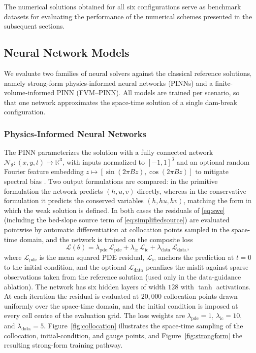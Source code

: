 \documentclass[12pt]{article}
\newenvironment{newtext}{\par\color{red}}{\par}
\begin{document}
The numerical solutions obtained for all six configurations serve as benchmark datasets for evaluating the performance of the numerical schemes presented in the subsequent sections.

\begin{newtext}
\subsection{Neural Network Models}

We evaluate two families of neural solvers against the classical reference solutions, namely strong-form physics-informed neural networks (PINNs) and a finite-volume-informed PINN (FVM--PINN). All models are trained per scenario, so that one network approximates the space-time solution of a single dam-break configuration.

\subsubsection{Physics-Informed Neural Networks}

The PINN parameterizes the solution with a fully connected network $\mathcal{N}_\theta:(x,y,t)\mapsto\mathbb{R}^3$, with inputs normalized to $[-1,1]^3$ and an optional random Fourier feature embedding $z \mapsto [\sin(2\pi B z), \cos(2\pi B z)]$ to mitigate spectral bias \cite{rahaman2019spectral}. Two output formulations are compared: in the primitive formulation the network predicts $(h,u,v)$ directly, whereas in the conservative formulation it predicts the conserved variables $(h,hu,hv)$, matching the form in which the weak solution is defined. In both cases the residuals of \cref{eq:swe} (including the bed-slope source term of \cref{eq:simplifiedsource}) are evaluated pointwise by automatic differentiation at collocation points sampled in the space-time domain, and the network is trained on the composite loss
\begin{equation}
\mathcal{L}(\theta)
=
\lambda_{\mathrm{pde}}\,\mathcal{L}_{\mathrm{pde}}
+
\lambda_{\mathrm{ic}}\,\mathcal{L}_{\mathrm{ic}}
+
\lambda_{\mathrm{data}}\,\mathcal{L}_{\mathrm{data}},
\label{eq:pinnloss}
\end{equation}
where $\mathcal{L}_{\mathrm{pde}}$ is the mean squared PDE residual, $\mathcal{L}_{\mathrm{ic}}$ anchors the prediction at $t=0$ to the initial condition, and the optional $\mathcal{L}_{\mathrm{data}}$ penalizes the misfit against sparse observations taken from the reference solution (used only in the data-guidance ablation). The network has six hidden layers of width $128$ with $\tanh$ activations. At each iteration the residual is evaluated at $20{,}000$ collocation points drawn uniformly over the space-time domain, and the initial condition is imposed at every cell centre of the evaluation grid. The loss weights are $\lambda_{\mathrm{pde}}=1$, $\lambda_{\mathrm{ic}}=10$, and $\lambda_{\mathrm{data}}=5$. Figure~\ref{fig:collocation} illustrates the space-time sampling of the collocation, initial-condition, and gauge points, and Figure~\ref{fig:strongform} the resulting strong-form training pathway.


\end{newtext}
\end{document}
